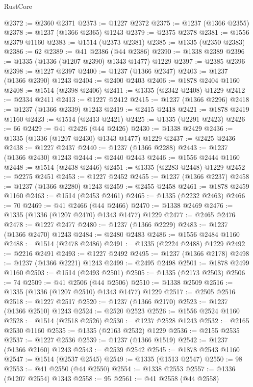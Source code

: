 \begin{lexlean}{RustCore}
\begin{coremodule}
@2372 := @2360 @2371
@2373 := @1227 @2372
@2375 := @1237 (@1366 @2355)
@2378 := @1237 (@1366 @2365) @1243
@2379 := @2375 @2378
@2381 := @1556 @2379 @1160
@2383 := @1514 (@2373 @2381)
@2385 := @1335 (@2350 @2383)
@2386 := 62
@2389 := @41 @2386 (@44 @2386)
@2390 := @1338 @2389
@2396 := @1335 (@1336 (@1207 @2390) @1343 @1477) @1229
@2397 := @2385 @2396
@2398 := @1227 @2397
@2400 := @1237 (@1366 @2347)
@2403 := @1237 (@1366 @2390) @1243
@2404 := @2400 @2403
@2406 := @1878 @2404 @1160
@2408 := @1514 (@2398 @2406)
@2411 := @1335 (@2342 @2408) @1229
@2412 := @2334 @2411
@2413 := @1227 @2412
@2415 := @1237 (@1366 @2296)
@2418 := @1237 (@1366 @2339) @1243
@2419 := @2415 @2418
@2421 := @1878 @2419 @1160
@2423 := @1514 (@2413 @2421)
@2425 := @1335 (@2291 @2423)
@2426 := 66
@2429 := @41 @2426 (@44 @2426)
@2430 := @1338 @2429
@2436 := @1335 (@1336 (@1207 @2430) @1343 @1477) @1229
@2437 := @2425 @2436
@2438 := @1227 @2437
@2440 := @1237 (@1366 @2288)
@2443 := @1237 (@1366 @2430) @1243
@2444 := @2440 @2443
@2446 := @1556 @2444 @1160
@2448 := @1514 (@2438 @2446)
@2451 := @1335 (@2283 @2448) @1229
@2452 := @2275 @2451
@2453 := @1227 @2452
@2455 := @1237 (@1366 @2237)
@2458 := @1237 (@1366 @2280) @1243
@2459 := @2455 @2458
@2461 := @1878 @2459 @1160
@2463 := @1514 (@2453 @2461)
@2465 := @1335 (@2232 @2463)
@2466 := 70
@2469 := @41 @2466 (@44 @2466)
@2470 := @1338 @2469
@2476 := @1335 (@1336 (@1207 @2470) @1343 @1477) @1229
@2477 := @2465 @2476
@2478 := @1227 @2477
@2480 := @1237 (@1366 @2229)
@2483 := @1237 (@1366 @2470) @1243
@2484 := @2480 @2483
@2486 := @1556 @2484 @1160
@2488 := @1514 (@2478 @2486)
@2491 := @1335 (@2224 @2488) @1229
@2492 := @2216 @2491
@2493 := @1227 @2492
@2495 := @1237 (@1366 @2178)
@2498 := @1237 (@1366 @2221) @1243
@2499 := @2495 @2498
@2501 := @1878 @2499 @1160
@2503 := @1514 (@2493 @2501)
@2505 := @1335 (@2173 @2503)
@2506 := 74
@2509 := @41 @2506 (@44 @2506)
@2510 := @1338 @2509
@2516 := @1335 (@1336 (@1207 @2510) @1343 @1477) @1229
@2517 := @2505 @2516
@2518 := @1227 @2517
@2520 := @1237 (@1366 @2170)
@2523 := @1237 (@1366 @2510) @1243
@2524 := @2520 @2523
@2526 := @1556 @2524 @1160
@2528 := @1514 (@2518 @2526)
@2530 := @1237 @2528 @1243
@2532 := @2165 @2530 @1160
@2535 := @1335 (@2163 @2532) @1229
@2536 := @2155 @2535
@2537 := @1227 @2536
@2539 := @1237 (@1366 @1519)
@2542 := @1237 (@1366 @2160) @1243
@2543 := @2539 @2542
@2545 := @1878 @2543 @1160
@2547 := @1514 (@2537 @2545)
@2549 := @1335 (@1513 @2547)
@2550 := 98
@2553 := @41 @2550 (@44 @2550)
@2554 := @1338 @2553
@2557 := @1336 (@1207 @2554) @1343
@2558 := 95
@2561 := @41 @2558 (@44 @2558)

\end{coremodule}
\end{lexlean}
